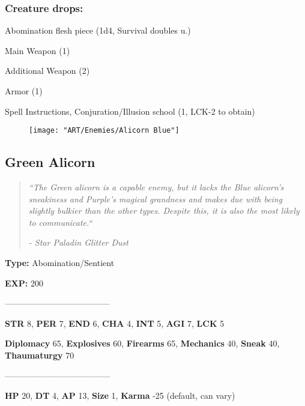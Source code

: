 \documentclass[11pt,a4paper,twocolumn]{book}
\begin{document}
	\subsubsection*{Creature drops:}
	\begin{compactitem}
		\item Abomination flesh piece (1d4, Survival doubles u.)
		\item Main Weapon (1)
		\item Additional Weapon (2)
		\item Armor (1)
		\item Spell Instructions, Conjuration/Illusion school (1, LCK-2 to obtain)
	\end{compactitem}
	
	\begin{figure}[h]
		\centering
		\texttt{[image: "ART/Enemies/Alicorn Blue"]}
	\end{figure}
	
	\vfill
	
	\newpage
	
			\subsection*{Green Alicorn}
		\begin{quote}
			\emph{``The Green alicorn is a capable enemy, but it lacks the Blue alicorn's sneakiness and Purple's magical grandness and makes due with being slightly bulkier than the other types. Despite this, it is also the most likely to communicate.``}
			
			\emph{-	Star Paladin Glitter Dust}
		\end{quote}
		
		\noindent
		\textbf{Type:} Abomination/Sentient
		
		\noindent
		\textbf{EXP:} 200
		
			--------------------------------------
		
		\noindent
		\textbf{STR} 8, \textbf{PER} 7, \textbf{END} 6, \textbf{CHA} 4, \textbf{INT} 5, \textbf{AGI} 7, \textbf{LCK} 5
		
		\noindent
		\textbf{Diplomacy} 65, \textbf{Explosives} 60, \textbf{Firearms} 65, \textbf{Mechanics} 40, \textbf{Sneak} 40, \textbf{Thaumaturgy} 70
		
		--------------------------------------
		
		\noindent
		\textbf{HP} 20, \textbf{DT} 4, \textbf{AP} 13, \textbf{Size} 1, \textbf{Karma} -25 (default, can vary)
		
\end{document}
